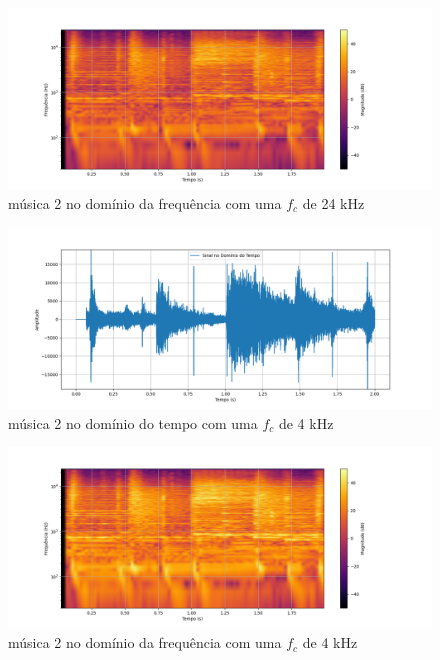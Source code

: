 \begin{anexosenv}
\begin{figure}[h]
	\centering
    \includegraphics[width=\textwidth]{figuras/fig33.png}
	\caption{música 2 no domínio da frequência com uma $f_c$ de 24 kHz}
	\label{fig33}
\end{figure}

\begin{figure}[h]
	\centering
    \includegraphics[width=\textwidth]{figuras/fig34.png}
	\caption{música 2 no domínio do tempo com uma $f_c$ de 4 kHz}
	\label{fig34}
\end{figure}

\begin{figure}[h]
	\centering
    \includegraphics[width=\textwidth]{figuras/fig35.png}
	\caption{música 2 no domínio da frequência com uma $f_c$ de 4 kHz}
	\label{fig35}
\end{figure}


\end{anexosenv}
